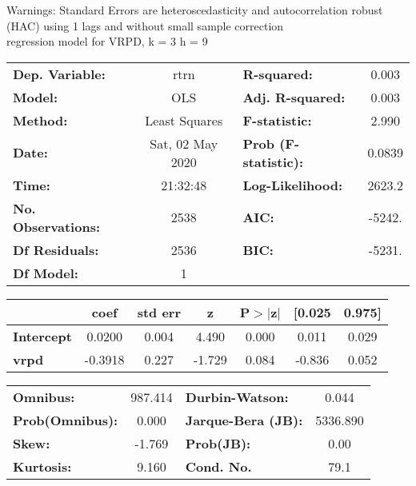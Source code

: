 Warnings: \newline
 [1] Standard Errors are heteroscedasticity and autocorrelation robust (HAC) using 1 lags and without small sample correction\\ 

regression model for VRPD, k = 3 h = 9\begin{center}
\begin{tabular}{lclc}
\toprule
\textbf{Dep. Variable:}    &       rtrn       & \textbf{  R-squared:         } &     0.003   \\
\textbf{Model:}            &       OLS        & \textbf{  Adj. R-squared:    } &     0.003   \\
\textbf{Method:}           &  Least Squares   & \textbf{  F-statistic:       } &     2.990   \\
\textbf{Date:}             & Sat, 02 May 2020 & \textbf{  Prob (F-statistic):} &   0.0839    \\
\textbf{Time:}             &     21:32:48     & \textbf{  Log-Likelihood:    } &    2623.2   \\
\textbf{No. Observations:} &        2538      & \textbf{  AIC:               } &    -5242.   \\
\textbf{Df Residuals:}     &        2536      & \textbf{  BIC:               } &    -5231.   \\
\textbf{Df Model:}         &           1      & \textbf{                     } &             \\
\bottomrule
\end{tabular}
\begin{tabular}{lcccccc}
                   & \textbf{coef} & \textbf{std err} & \textbf{z} & \textbf{P$> |$z$|$} & \textbf{[0.025} & \textbf{0.975]}  \\
\midrule
\textbf{Intercept} &       0.0200  &        0.004     &     4.490  &         0.000        &        0.011    &        0.029     \\
\textbf{vrpd}      &      -0.3918  &        0.227     &    -1.729  &         0.084        &       -0.836    &        0.052     \\
\bottomrule
\end{tabular}
\begin{tabular}{lclc}
\textbf{Omnibus:}       & 987.414 & \textbf{  Durbin-Watson:     } &    0.044  \\
\textbf{Prob(Omnibus):} &   0.000 & \textbf{  Jarque-Bera (JB):  } & 5336.890  \\
\textbf{Skew:}          &  -1.769 & \textbf{  Prob(JB):          } &     0.00  \\
\textbf{Kurtosis:}      &   9.160 & \textbf{  Cond. No.          } &     79.1  \\
\bottomrule
\end{tabular}
\end{center}

